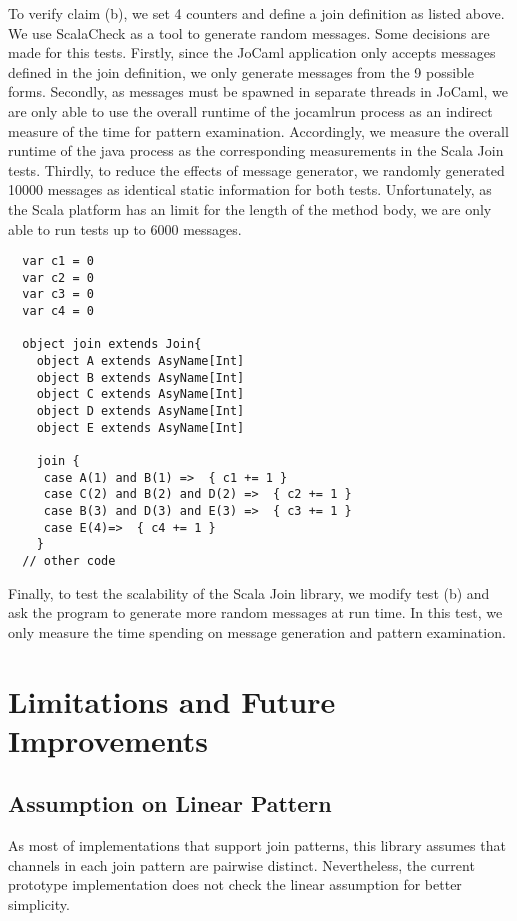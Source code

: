 To verify claim (b), we set 4 counters and define a join definition as listed above.  We use ScalaCheck \cite{ScalaCheck} as a tool to generate random messages.  Some decisions are made for this tests.  Firstly, since the JoCaml application only accepts messages defined in the join definition, we only generate messages from the 9 possible forms.  Secondly, as messages must be spawned in separate threads in JoCaml, we are only able to use the overall runtime of the jocamlrun process as an indirect measure of the time for pattern examination.  Accordingly, we measure the overall runtime of the java process as the corresponding measurements in the Scala Join tests.  Thirdly, to reduce the effects of message generator, we randomly generated 10000 messages as identical static information for both tests.  Unfortunately, as the Scala platform has an limit for the length of the method body, we are only able to run tests up to 6000 messages.  

\begin{lstlisting}
  var c1 = 0
  var c2 = 0
  var c3 = 0
  var c4 = 0
  
  object join extends Join{  
    object A extends AsyName[Int]  
    object B extends AsyName[Int]
    object C extends AsyName[Int]
    object D extends AsyName[Int]
    object E extends AsyName[Int]
    
    join {
     case A(1) and B(1) =>  { c1 += 1 }
     case C(2) and B(2) and D(2) =>  { c2 += 1 }
     case B(3) and D(3) and E(3) =>  { c3 += 1 }
     case E(4)=>  { c4 += 1 }
    }
  // other code
\end{lstlisting}



Finally, to test the scalability of the Scala Join library, we modify test (b) and ask the program to generate more random messages at run time.  In this test, we only measure the time spending on message generation and pattern examination.






\section{Limitations and Future Improvements}
\subsection{Assumption on Linear Pattern}
As most of implementations that support join patterns, this library assumes that channels in each join pattern are pairwise distinct.  Nevertheless, the current prototype implementation does not check the linear assumption for better simplicity.  


